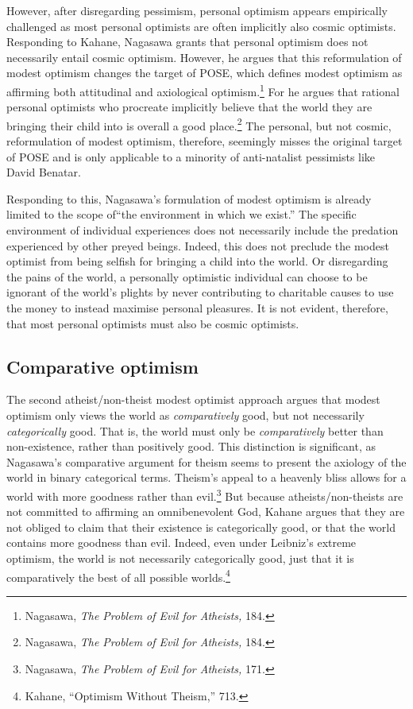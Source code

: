 However, after disregarding pessimism, personal optimism appears
empirically challenged as most personal optimists are often implicitly
also cosmic optimists. Responding to Kahane, Nagasawa grants that
personal optimism does not necessarily entail cosmic optimism. However,
he argues that this reformulation of modest optimism changes the target
of POSE, which defines modest optimism as affirming both attitudinal and
axiological optimism.\footnote{Nagasawa, \emph{The Problem of Evil for
  Atheists,} 184.} For he argues that rational personal optimists who
procreate implicitly believe that the world they are bringing their
child into is overall a good place.\footnote{Nagasawa, \emph{The Problem of Evil for
  Atheists,} 184.} The personal, but
not cosmic, reformulation of modest optimism, therefore, seemingly
misses the original target of POSE and is only applicable to a minority
of anti-natalist pessimists like David Benatar.

Responding to this, Nagasawa's formulation of modest optimism is already
limited to the scope of``the environment in which we exist.'' The
specific environment of individual experiences does not necessarily
include the predation experienced by other preyed beings. Indeed, this
does not preclude the modest optimist from being selfish for bringing a
child into the world. Or disregarding the pains of the world, a
personally optimistic individual can choose to be ignorant of the
world's plights by never contributing to charitable causes to use the
money to instead maximise personal pleasures. It is not evident,
therefore, that most personal optimists must also be cosmic optimists.

\subsection{Comparative optimism}

The second atheist/non-theist modest optimist approach argues that
modest optimism only views the world as \emph{comparatively} good, but
not necessarily \emph{categorically} good. That is, the world must only
be \emph{comparatively} better than non-existence, rather than
positively good. This distinction is significant, as Nagasawa's
comparative argument for theism seems to present the axiology of the
world in binary categorical terms. Theism's appeal to a heavenly bliss
allows for a world with more goodness rather than evil.\footnote{Nagasawa, \emph{The Problem of Evil for Atheists,} 171.} But because atheists/non-theists are not committed to affirming
an omnibenevolent God, Kahane argues that they are not obliged to claim
that their existence is categorically good, or that the world contains
more goodness than evil. Indeed, even under Leibniz's extreme optimism,
the world is not necessarily categorically good, just that it is
comparatively the best of all possible worlds.\footnote{Kahane,
  ``Optimism Without Theism,'' 713.}

